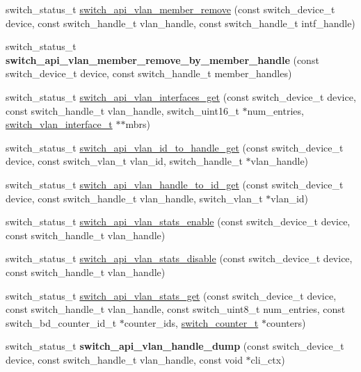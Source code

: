 \begin{DoxyCompactItemize}
\item 
switch\+\_\+status\+\_\+t \hyperlink{group__VLAN_ga6802cba443697307526f234af3079f62}{switch\+\_\+api\+\_\+vlan\+\_\+member\+\_\+remove} (const switch\+\_\+device\+\_\+t device, const switch\+\_\+handle\+\_\+t vlan\+\_\+handle, const switch\+\_\+handle\+\_\+t intf\+\_\+handle)
\item 
\hypertarget{group__VLAN_ga98158d6d6e4d8cf816c2c860102c4581}{switch\+\_\+status\+\_\+t {\bfseries switch\+\_\+api\+\_\+vlan\+\_\+member\+\_\+remove\+\_\+by\+\_\+member\+\_\+handle} (const switch\+\_\+device\+\_\+t device, const switch\+\_\+handle\+\_\+t member\+\_\+handles)}\label{group__VLAN_ga98158d6d6e4d8cf816c2c860102c4581}

\item 
switch\+\_\+status\+\_\+t \hyperlink{group__VLAN_ga8f8e46977088ec6fca4612da284466f5}{switch\+\_\+api\+\_\+vlan\+\_\+interfaces\+\_\+get} (const switch\+\_\+device\+\_\+t device, const switch\+\_\+handle\+\_\+t vlan\+\_\+handle, switch\+\_\+uint16\+\_\+t $\ast$num\+\_\+entries, \hyperlink{structswitch__vlan__interface__}{switch\+\_\+vlan\+\_\+interface\+\_\+t} $\ast$$\ast$mbrs)
\item 
switch\+\_\+status\+\_\+t \hyperlink{group__VLAN_ga5e04a16e1d47aef8cf5385c7bd46d508}{switch\+\_\+api\+\_\+vlan\+\_\+id\+\_\+to\+\_\+handle\+\_\+get} (const switch\+\_\+device\+\_\+t device, const switch\+\_\+vlan\+\_\+t vlan\+\_\+id, switch\+\_\+handle\+\_\+t $\ast$vlan\+\_\+handle)
\item 
switch\+\_\+status\+\_\+t \hyperlink{group__VLAN_gad33fe80bba68efbc1ee4867a87782d88}{switch\+\_\+api\+\_\+vlan\+\_\+handle\+\_\+to\+\_\+id\+\_\+get} (const switch\+\_\+device\+\_\+t device, const switch\+\_\+handle\+\_\+t vlan\+\_\+handle, switch\+\_\+vlan\+\_\+t $\ast$vlan\+\_\+id)
\item 
switch\+\_\+status\+\_\+t \hyperlink{group__VLAN_ga40627ca2ddc9afa7fed5d0c52a972925}{switch\+\_\+api\+\_\+vlan\+\_\+stats\+\_\+enable} (const switch\+\_\+device\+\_\+t device, const switch\+\_\+handle\+\_\+t vlan\+\_\+handle)
\item 
switch\+\_\+status\+\_\+t \hyperlink{group__VLAN_gab68bd3bdc40dd0156ae7be2f475c01ea}{switch\+\_\+api\+\_\+vlan\+\_\+stats\+\_\+disable} (const switch\+\_\+device\+\_\+t device, const switch\+\_\+handle\+\_\+t vlan\+\_\+handle)
\item 
switch\+\_\+status\+\_\+t \hyperlink{group__VLAN_ga4f90f6fb5b09a7278a958500cca7d523}{switch\+\_\+api\+\_\+vlan\+\_\+stats\+\_\+get} (const switch\+\_\+device\+\_\+t device, const switch\+\_\+handle\+\_\+t vlan\+\_\+handle, const switch\+\_\+uint8\+\_\+t num\+\_\+entries, const switch\+\_\+bd\+\_\+counter\+\_\+id\+\_\+t $\ast$counter\+\_\+ids, \hyperlink{structswitch__counter__s}{switch\+\_\+counter\+\_\+t} $\ast$counters)
\item 
\hypertarget{group__VLAN_ga45cfb8305c79d90f422ca4aed52d71bb}{switch\+\_\+status\+\_\+t {\bfseries switch\+\_\+api\+\_\+vlan\+\_\+handle\+\_\+dump} (const switch\+\_\+device\+\_\+t device, const switch\+\_\+handle\+\_\+t vlan\+\_\+handle, const void $\ast$cli\+\_\+ctx)}\label{group__VLAN_ga45cfb8305c79d90f422ca4aed52d71bb}


\end{DoxyCompactItemize}
